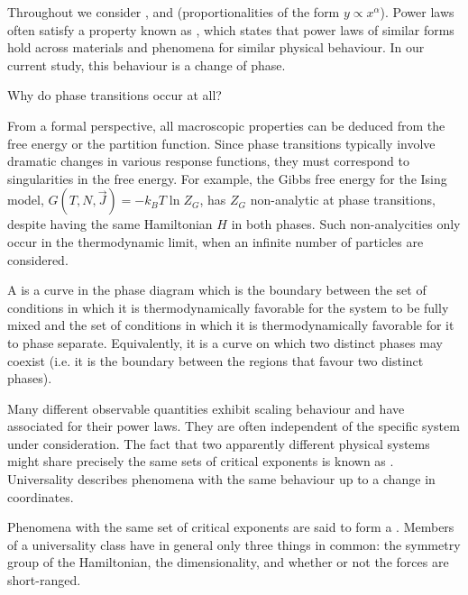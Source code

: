 \documentclass[12pt, a4paper, oneside, openright, titlepage]{book}
\begin{document}
Throughout we consider , and  (proportionalities of the form $y \propto x^{\alpha}$). Power laws often satisfy a property known as , which states that power laws of similar forms hold across materials and phenomena for similar physical behaviour. In our current study, this behaviour is a change of phase.

\begin{qst}
    Why do phase transitions occur at all?
\end{qst}

From a formal perspective, all macroscopic properties can be deduced from the free energy or the partition function. Since phase transitions typically involve dramatic changes in various response functions, they must correspond to singularities in the free energy. For example, the Gibbs free energy for the Ising model, $G(T,N,\vec{J}) = -k_BT\ln Z_G$, has $Z_G$ non-analytic at phase transitions, despite having the same Hamiltonian $H$ in both phases. Such non-analycities only occur in the thermodynamic limit, when an infinite number of particles are considered.

\begin{defn}
    A  is a curve in the phase diagram which is the boundary between the set of conditions in which it is thermodynamically favorable for the system to be fully mixed and the set of conditions in which it is thermodynamically favorable for it to phase separate. Equivalently, it is a curve on which two distinct phases may coexist (i.e. it is the boundary between the regions that favour two distinct phases).
\end{defn}

\begin{defn}
    Many different observable quantities exhibit scaling behaviour and have associated  for their power laws. They are often independent of the specific system under consideration. The fact that two apparently different physical systems might share precisely the same sets of critical exponents is known as . Universality describes phenomena with the same behaviour up to a change in coordinates.

    Phenomena with the same set of critical exponents are said to form a . Members of a universality class have in general only three things in common: the symmetry group of the Hamiltonian, the dimensionality, and whether or not the forces are short-ranged.
\end{defn}
\end{document}
